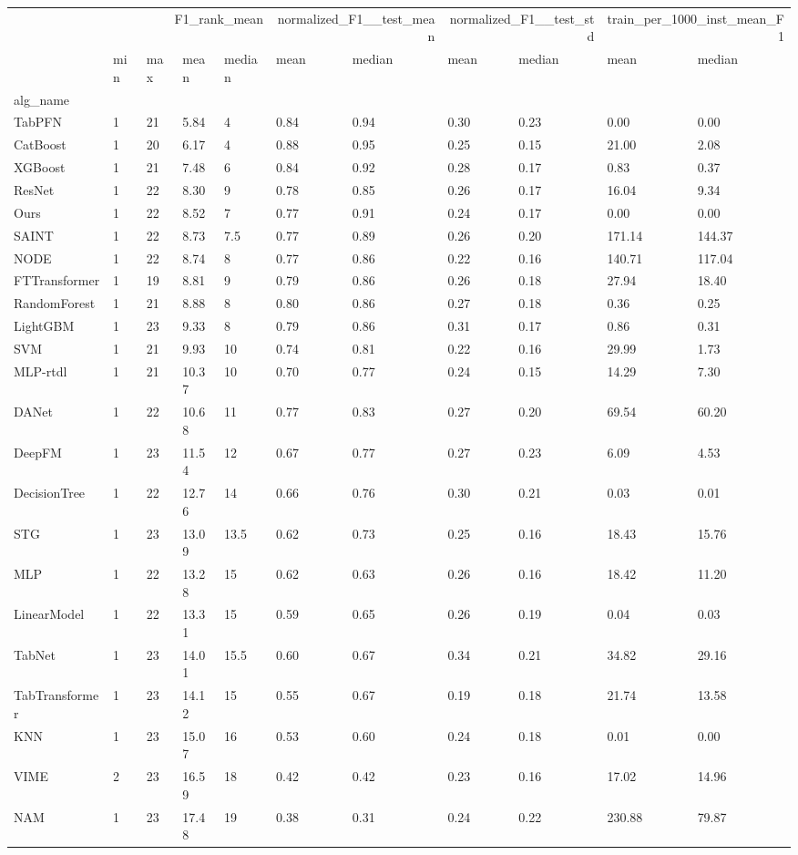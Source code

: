 \begin{tabular}{lllllllllll}
\toprule
 & \multicolumn{4}{r}{F1_rank_mean} & \multicolumn{2}{r}{normalized_F1__test_mean} & \multicolumn{2}{r}{normalized_F1__test_std} & \multicolumn{2}{r}{train_per_1000_inst_mean_F1} \\
 & min & max & mean & median & mean & median & mean & median & mean & median \\
alg_name &  &  &  &  &  &  &  &  &  &  \\
\midrule
TabPFN & 1 & 21 & 5.84 & 4 & 0.84 & 0.94 & 0.30 & 0.23 & 0.00 & 0.00 \\
CatBoost & 1 & 20 & 6.17 & 4 & 0.88 & 0.95 & 0.25 & 0.15 & 21.00 & 2.08 \\
XGBoost & 1 & 21 & 7.48 & 6 & 0.84 & 0.92 & 0.28 & 0.17 & 0.83 & 0.37 \\
ResNet & 1 & 22 & 8.30 & 9 & 0.78 & 0.85 & 0.26 & 0.17 & 16.04 & 9.34 \\
Ours & 1 & 22 & 8.52 & 7 & 0.77 & 0.91 & 0.24 & 0.17 & 0.00 & 0.00 \\
SAINT & 1 & 22 & 8.73 & 7.5 & 0.77 & 0.89 & 0.26 & 0.20 & 171.14 & 144.37 \\
NODE & 1 & 22 & 8.74 & 8 & 0.77 & 0.86 & 0.22 & 0.16 & 140.71 & 117.04 \\
FTTransformer & 1 & 19 & 8.81 & 9 & 0.79 & 0.86 & 0.26 & 0.18 & 27.94 & 18.40 \\
RandomForest & 1 & 21 & 8.88 & 8 & 0.80 & 0.86 & 0.27 & 0.18 & 0.36 & 0.25 \\
LightGBM & 1 & 23 & 9.33 & 8 & 0.79 & 0.86 & 0.31 & 0.17 & 0.86 & 0.31 \\
SVM & 1 & 21 & 9.93 & 10 & 0.74 & 0.81 & 0.22 & 0.16 & 29.99 & 1.73 \\
MLP-rtdl & 1 & 21 & 10.37 & 10 & 0.70 & 0.77 & 0.24 & 0.15 & 14.29 & 7.30 \\
DANet & 1 & 22 & 10.68 & 11 & 0.77 & 0.83 & 0.27 & 0.20 & 69.54 & 60.20 \\
DeepFM & 1 & 23 & 11.54 & 12 & 0.67 & 0.77 & 0.27 & 0.23 & 6.09 & 4.53 \\
DecisionTree & 1 & 22 & 12.76 & 14 & 0.66 & 0.76 & 0.30 & 0.21 & 0.03 & 0.01 \\
STG & 1 & 23 & 13.09 & 13.5 & 0.62 & 0.73 & 0.25 & 0.16 & 18.43 & 15.76 \\
MLP & 1 & 22 & 13.28 & 15 & 0.62 & 0.63 & 0.26 & 0.16 & 18.42 & 11.20 \\
LinearModel & 1 & 22 & 13.31 & 15 & 0.59 & 0.65 & 0.26 & 0.19 & 0.04 & 0.03 \\
TabNet & 1 & 23 & 14.01 & 15.5 & 0.60 & 0.67 & 0.34 & 0.21 & 34.82 & 29.16 \\
TabTransformer & 1 & 23 & 14.12 & 15 & 0.55 & 0.67 & 0.19 & 0.18 & 21.74 & 13.58 \\
KNN & 1 & 23 & 15.07 & 16 & 0.53 & 0.60 & 0.24 & 0.18 & 0.01 & 0.00 \\
VIME & 2 & 23 & 16.59 & 18 & 0.42 & 0.42 & 0.23 & 0.16 & 17.02 & 14.96 \\
NAM & 1 & 23 & 17.48 & 19 & 0.38 & 0.31 & 0.24 & 0.22 & 230.88 & 79.87 \\
\bottomrule
\end{tabular}
